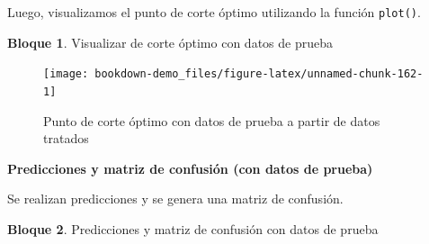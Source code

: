 \documentclass[]{book}
\newenvironment{Shaded}{\begin{snugshade}}{\end{snugshade}}
\newcommand{\DataTypeTok}[1]{\textcolor[rgb]{0.13,0.29,0.53}{#1}}
\newcommand{\DecValTok}[1]{\textcolor[rgb]{0.00,0.00,0.81}{#1}}
\newcommand{\FloatTok}[1]{\textcolor[rgb]{0.00,0.00,0.81}{#1}}
\newcommand{\KeywordTok}[1]{\textcolor[rgb]{0.13,0.29,0.53}{\textbf{#1}}}
\newcommand{\NormalTok}[1]{#1}
\newcommand{\OperatorTok}[1]{\textcolor[rgb]{0.81,0.36,0.00}{\textbf{#1}}}
\newcommand{\OtherTok}[1]{\textcolor[rgb]{0.56,0.35,0.01}{#1}}
\newcommand{\StringTok}[1]{\textcolor[rgb]{0.31,0.60,0.02}{#1}}
\theoremstyle{definition}
\theoremstyle{definition}
\newtheorem{example}{Bloque}[chapter]
\theoremstyle{definition}
\theoremstyle{definition}
\theoremstyle{remark}
\begin{document}
Luego, visualizamos el punto de corte óptimo utilizando la función \texttt{plot()}.

\begin{example}
\protect\hypertarget{exm:bloque89nbm}{}{\label{exm:bloque89nbm} }Visualizar de corte óptimo con datos de prueba
\end{example}

\begin{Shaded}
\end{Shaded}

\begin{figure}
\texttt{[image: bookdown-demo\_files/figure-latex/unnamed-chunk-162-1]} \caption{Punto de corte óptimo con datos de prueba a partir de datos tratados}\label{fig:unnamed-chunk-162}
\end{figure}

\textbf{Predicciones y matriz de confusión (con datos de prueba)}

Se realizan predicciones y se genera una matriz de confusión.

\begin{example}
\protect\hypertarget{exm:bloque90nbm}{}{\label{exm:bloque90nbm} }Predicciones y matriz de confusión con datos de prueba
\end{example}

\begin{Shaded}
\end{Shaded}
\end{document}
